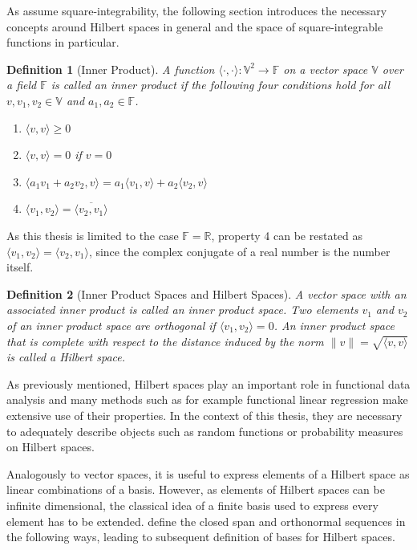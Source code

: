 \documentclass[12pt, a4paper]{article}
\theoremstyle{MAstyle} \newtheorem{assumption}{Assumption}[section]
\theoremstyle{MAstyle} \newtheorem{definition}{Definition}[section]
\theoremstyle{MAstyle} \newtheorem{theorem}{Theorem}[section]
\begin{document}
			As \cite{bugni_permutation_2021} assume square-integrability, the following section introduces the necessary concepts around Hilbert spaces in general and the space of square-integrable functions in particular.
			\begin{definition}[Inner Product]
				A function $\langle \cdot , \cdot \rangle : \mathbb{V}^2 \rightarrow \mathbb{F}$ on a vector space $\mathbb{V}$ over a field $\mathbb{F}$ is called an inner product if the following four conditions hold for all $v, v_1, v_2 \in \mathbb{V}$ and $a_1, a_2 \in \mathbb{F}$.
				\begin{multicols}{2}
					\begin{enumerate}
						\item $\langle v,v \rangle \geq 0$
						\item $\langle v,v \rangle = 0$ if $v = 0$
						\item $\langle a_1 v_1 + a_2 v_2, v \rangle = a_1 \langle v_1, v \rangle + a_2 \langle v_2, v \rangle$
						\item $\langle v_1, v_2 \rangle = \overline{\langle v_2, v_1 \rangle}$
					\end{enumerate}
				\end{multicols}
			\end{definition}
			As this thesis is limited to the case $\mathbb{F} = \mathbb{R}$, property 4 can be restated as $\langle v_1, v_2 \rangle = \langle v_2, v_1 \rangle$, since the complex conjugate of a real number is the number itself.
			
			\begin{definition}[Inner Product Spaces and Hilbert Spaces]
				A vector space with an associated inner product is called an inner product space. Two elements $v_1$ and $v_2$ of an inner product space are orthogonal if $\langle v_1, v_2 \rangle = 0$.
				An inner product space that is complete with respect to the distance induced by the norm $\| v \| = \sqrt{\langle v, v\rangle}$ is called a Hilbert space.
			\end{definition}
			As previously mentioned, Hilbert spaces play an important role in functional data analysis and many methods such as for example functional linear regression make extensive use of their properties. In the context of this thesis, they are necessary to adequately describe objects such as random functions or probability measures on Hilbert spaces.
			
			Analogously to vector spaces, it is useful to express elements of a Hilbert space as linear combinations of a basis. However, as elements of Hilbert spaces can be infinite dimensional, the classical idea of a finite basis used to express every element has to be extended. \cite{hsing_theoretical_2015} define the closed span and orthonormal sequences in the following ways, leading to subsequent definition of bases for Hilbert spaces.
		
\end{document}
